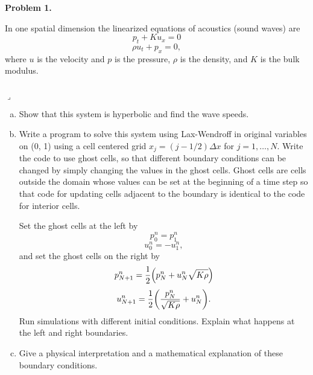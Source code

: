 \documentclass[12pt]{article}
\newenvironment{myprob}[1]
    {%
    \noindent{\Huge$\ulcorner$}\textbf{#1.}\begin{em}
    }
    { 
    \end{em} \\ \hphantom{l} \hfill {\Huge$\lrcorner$} }
\begin{document}
\rhead{\today}

{\let\newpage\relax} 


\begin{myprob}{Problem 1}
In one spatial dimension the linearized equations of acoustics (sound waves) are
$$p_t + K u_x = 0 $$
$$\rho u_t + p_x =0,$$
where $u$ is the velocity and $p$ is the pressure, $\rho$ is the density, and $K$ is the bulk modulus.
\end{myprob}
\begin{enumerate}[(a)]
\item Show that this system is hyperbolic and find the wave speeds.

\item Write a program to solve this system using Lax-Wendroff in original variables on (0, 1) using a cell centered grid $x_j = (j - 1/2)\Delta x $ for $j = 1,\dots, N$. Write the code to use ghost cells, so that different boundary conditions can be changed by simply changing the values in the ghost cells. Ghost cells are cells outside the domain whose values can be set at the beginning of a time step so that code for updating cells adjacent to the boundary is identical to the code for interior cells.

Set the ghost cells at the left by 
$$p_0^n = p_1^n $$
$$u_0^n = -u_1^n,$$
and set the ghost cells on the right by
$$p_{N+1}^n = \frac{1}{2}\qty(p_N^n + u_N^n \sqrt{K\rho})$$
$$u_{N+1}^n = \frac{1}{2} \qty(\dfrac{p_N^n}{\sqrt{K\rho}} + u_N^n). $$
Run simulations with different initial conditions. Explain what happens at the left and right boundaries.

\item Give a physical interpretation and a mathematical explanation of these boundary conditions.
\end{enumerate}
\end{document}
